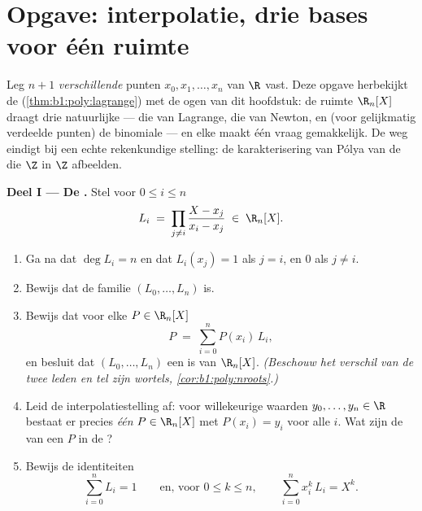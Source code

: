 \section{Opgave: interpolatie, drie bases voor één ruimte}

\begin{problem}\label{pb:b1:vspaces:1}
Leg $n + 1$ \emph{verschillende} punten $x_0, x_1, \dots, x_n$ van
$\R$ vast. Deze opgave herbekijkt de 
(\cref{thm:b1:poly:lagrange}) met de ogen van dit hoofdstuk: de
ruimte $\R_n[X]$ draagt drie natuurlijke  --- die van
Lagrange, die van Newton, en (voor gelijkmatig verdeelde punten) de
binomiale  --- en elke  maakt één vraag gemakkelijk. De
weg eindigt bij een echte rekenkundige stelling: de
karakterisering van Pólya van de  die $\Z$ in $\Z$
afbeelden.

\medskip
\noindent\textbf{Deel I --- De .} Stel voor $0 \leq
i \leq n$
\[
L_i \;=\; \prod_{j \neq i} \frac{X - x_j}{x_i - x_j} \;\in\;
\R_n[X].
\]
\begin{enumerate}
  \item Ga na dat $\deg L_i = n$ en dat $L_i(x_j) = 1$ als $j = i$,
        en $0$ als $j \neq i$.
  \item Bewijs dat de familie $(L_0, \dots, L_n)$  is.
  \item Bewijs dat voor elke $P \in \R_n[X]$
        \[
        P \;=\; \sum_{i=0}^{n} P(x_i)\, L_i ,
        \]
        en besluit dat $(L_0, \dots, L_n)$ een  is van
        $\R_n[X]$. \emph{(Beschouw het verschil van de twee leden
        en tel zijn wortels, \cref{cor:b1:poly:nroots}.)}
  \item Leid de interpolatiestelling af: voor willekeurige waarden
        $y_0, \dots, y_n \in \R$ bestaat er precies \emph{één} $P
        \in \R_n[X]$ met $P(x_i) = y_i$ voor alle $i$. Wat zijn de
         van een  $P$ in de ?
  \item Bewijs de identiteiten
        \[
        \sum_{i=0}^{n} L_i = 1
        \qquad\text{en, voor } 0 \leq k \leq n,\qquad
        \sum_{i=0}^{n} x_i^{k}\, L_i = X^{k} .
        \]
\end{enumerate}


\end{problem}
